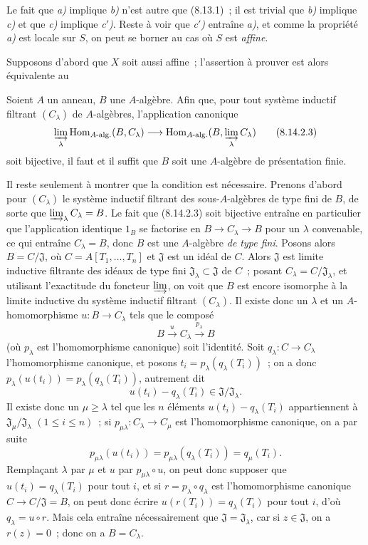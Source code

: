 Le fait que \emph{a)} implique \emph{b)} n'est autre que (8.13.1)~; il est
trivial que \emph{b)} implique \emph{c)} et que \emph{c)} implique
\emph{c$'$)}. Reste à voir que \emph{c$'$)} entraîne \emph{a)}, et comme la
propriété \emph{a)} est locale sur $S$, on peut se borner au cas où $S$ est
\emph{affine}.

Supposons d'abord que $X$ soit aussi affine~; l'assertion à prouver est alors
équivalente au

\begin{corollary}[8.14.2.2]
\label{IV.8.14.2.2-fr}
Soient $A$ un anneau, $B$ une $A$-algèbre. Afin que, pour tout système
inductif filtrant $(C_\lambda)$ de $A$-algèbres, l'application canonique
\begin{equation}
\label{IV.8.14.2.3-fr}
\varinjlim_\lambda\operatorname{Hom}_{A\text{-}\mathrm{alg.}}(B,C_\lambda)
\longrightarrow
\operatorname{Hom}_{A\text{-}\mathrm{alg.}}
(B,\varinjlim_\lambda C_\lambda) \tag{8.14.2.3}
\end{equation}
soit bijective, il faut et il suffit que $B$ soit une $A$-algèbre de
présentation finie.
\end{corollary}

Il reste seulement à montrer que la condition est nécessaire. Prenons d'abord
pour $(C_\lambda)$ le système inductif filtrant des sous-$A$-algèbres de type
fini de $B$, de sorte que $\varinjlim_\lambda C_\lambda=B$. Le fait que (8.14.2.3)
soit bijective entraîne en particulier que l'application identique
$1_B$ se factorise en $B\to C_\lambda\to B$ pour un $\lambda$ convenable,
ce qui entraîne $C_\lambda=B$, donc $B$ est une $A$-algèbre \emph{de type
fini}. Posons alors $B=C/\mathfrak J$, où
$C=A[T_1,\ldots,T_n]$ et $\mathfrak J$ est un idéal de $C$. Alors
$\mathfrak J$ est limite inductive filtrante des idéaux de type fini
$\mathfrak J_\lambda\subset\mathfrak J$ de $C$~; posant
$C_\lambda=C/\mathfrak J_\lambda$, et utilisant l'exactitude du foncteur
$\varinjlim$, on voit que $B$ est encore isomorphe à la limite inductive du
système inductif filtrant $(C_\lambda)$. Il existe donc un $\lambda$ et un
$A$-homomorphisme $u:B\to C_\lambda$ tels que le composé
\[
B\xrightarrow{u}C_\lambda\xrightarrow{p_\lambda}B
\]
(où $p_\lambda$ est l'homomorphisme canonique) soit l'identité. Soit
$q_\lambda:C\to C_\lambda$ l'homomorphisme canonique, et posons
$t_i=p_\lambda(q_\lambda(T_i))$~; on a donc
$p_\lambda(u(t_i))=p_\lambda(q_\lambda(T_i))$, autrement dit
\[
u(t_i)-q_\lambda(T_i)\in\mathfrak J/\mathfrak J_\lambda.
\]
Il existe donc un $\mu\geqslant\lambda$ tel que les $n$ éléments
$u(t_i)-q_\lambda(T_i)$ appartiennent à
$\mathfrak J_\mu/\mathfrak J_\lambda$ $(1\leqslant i\leqslant n)$~; si
$p_{\mu\lambda}:C_\lambda\to C_\mu$ est l'homomorphisme canonique, on a par
suite
\[
p_{\mu\lambda}(u(t_i))
=p_{\mu\lambda}(q_\lambda(T_i))=q_\mu(T_i).
\]
Remplaçant $\lambda$ par $\mu$ et $u$ par $p_{\mu\lambda}\circ u$, on peut
donc supposer que $u(t_i)=q_\lambda(T_i)$ pour tout $i$, et si
$r=p_\lambda\circ q_\lambda$ est l'homomorphisme canonique
$C\to C/\mathfrak J=B$, on peut donc écrire
$u(r(T_i))=q_\lambda(T_i)$ pour tout $i$, d'où
$q_\lambda=u\circ r$. Mais cela entraîne nécessairement que
$\mathfrak J=\mathfrak J_\lambda$, car si $z\in\mathfrak J$, on a
$r(z)=0$~; donc on a $B=C_\lambda$.

